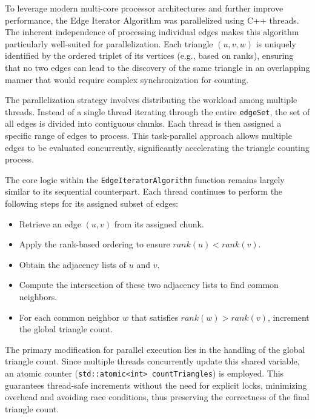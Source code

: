 \documentclass{aes2e}
\begin{document}
To leverage modern multi-core processor architectures and further improve performance, the Edge Iterator Algorithm was parallelized using C++ threads. The inherent independence of processing individual edges makes this algorithm particularly well-suited for parallelization. Each triangle $(u, v, w)$ is uniquely identified by the ordered triplet of its vertices (e.g., based on ranks), ensuring that no two edges can lead to the discovery of the same triangle in an overlapping manner that would require complex synchronization for counting.

The parallelization strategy involves distributing the workload among multiple threads. Instead of a single thread iterating through the entire \texttt{edgeSet}, the set of all edges is divided into contiguous chunks. Each thread is then assigned a specific range of edges to process. This task-parallel approach allows multiple edges to be evaluated concurrently, significantly accelerating the triangle counting process.

The core logic within the \texttt{EdgeIteratorAlgorithm} function remains largely similar to its sequential counterpart. Each thread continues to perform the following steps for its assigned subset of edges:
\begin{itemize}
    \item Retrieve an edge $(u, v)$ from its assigned chunk.
    \item Apply the rank-based ordering to ensure $rank(u) < rank(v)$.
    \item Obtain the adjacency lists of $u$ and $v$.
    \item Compute the intersection of these two adjacency lists to find common neighbors.
    \item For each common neighbor $w$ that satisfies $rank(w) > rank(v)$, increment the global triangle count.
\end{itemize}
The primary modification for parallel execution lies in the handling of the global triangle count. Since multiple threads concurrently update this shared variable, an atomic counter (\texttt{std::atomic<int> countTriangles}) is employed. This guarantees thread-safe increments without the need for explicit locks, minimizing overhead and avoiding race conditions, thus preserving the correctness of the final triangle count.
\end{document}
